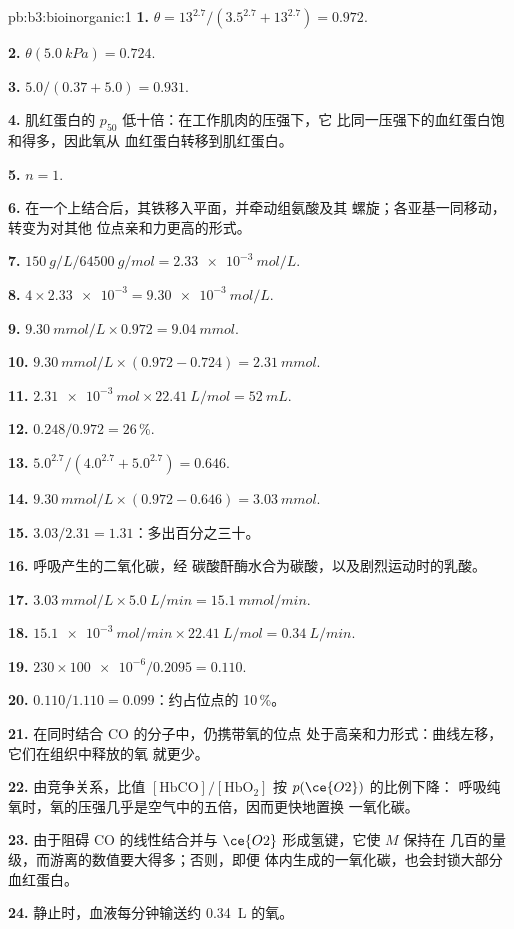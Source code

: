 \begin{solution}{pb:b3:bioinorganic:1}
\textbf{1.} $\theta = 13^{2.7}/(3.5^{2.7} + 13^{2.7}) = 0.972$.

\textbf{2.} $\theta(\qty{5.0}{kPa}) = 0.724$.

\textbf{3.} $5.0/(0.37 + 5.0) = 0.931$.

\textbf{4.} 肌红蛋白的 $p_{50}$ 低十倍：在工作肌肉的压强下，它
比同一压强下的血红蛋白饱和得多，因此氧从
血红蛋白转移到肌红蛋白。

\textbf{5.} $n = 1$.

\textbf{6.} 在一个上结合后，其铁移入平面，并牵动组氨酸及其
螺旋；各亚基一同移动，转变为对其他
位点亲和力更高的形式。

\textbf{7.} $\qty{150}{g/L}/\qty{64500}{g/mol} = \qty{2.33e-3}{mol/L}$.

\textbf{8.} $4 \times \num{2.33e-3} = \qty{9.30e-3}{mol/L}$.

\textbf{9.} $\qty{9.30}{mmol/L} \times 0.972 = \qty{9.04}{mmol}$.

\textbf{10.} $\qty{9.30}{mmol/L} \times (0.972 - 0.724) = \qty{2.31}{mmol}$.

\textbf{11.} $\qty{2.31e-3}{mol} \times \qty{22.41}{L/mol} = \qty{52}{mL}$.

\textbf{12.} $0.248/0.972 = 26$\,\%.

\textbf{13.} $5.0^{2.7}/(4.0^{2.7} + 5.0^{2.7}) = 0.646$.

\textbf{14.} $\qty{9.30}{mmol/L} \times (0.972 - 0.646) = \qty{3.03}{mmol}$.

\textbf{15.} $3.03/2.31 = 1.31$：多出百分之三十。

\textbf{16.} 呼吸产生的二氧化碳，经
碳酸酐酶水合为碳酸，以及剧烈运动时的乳酸。

\textbf{17.} $\qty{3.03}{mmol/L} \times \qty{5.0}{L/min} = \qty{15.1}{mmol/min}$.

\textbf{18.} $\qty{15.1e-3}{mol/min} \times \qty{22.41}{L/mol} = \qty{0.34}{L/min}$.

\textbf{19.} $230 \times \num{100e-6}/0.2095 = 0.110$.

\textbf{20.} $0.110/1.110 = 0.099$：约占位点的 10\,\%。

\textbf{21.} 在同时结合 CO 的分子中，仍携带氧的位点
处于高亲和力形式：曲线左移，它们在组织中释放的氧
就更少。

\textbf{22.} 由竞争关系，比值 $[\mathrm{HbCO}]/[\mathrm{HbO_2}]$ 按 $p(\ce{O2})$ 的比例下降：
呼吸纯氧时，氧的压强几乎是空气中的五倍，因而更快地置换
一氧化碳。

\textbf{23.} 由于阻碍 CO 的线性结合并与 $\ce{O2}$ 形成氢键，它使 $M$ 保持在
几百的量级，而游离的数值要大得多；否则，即便
体内生成的一氧化碳，也会封锁大部分血红蛋白。

\textbf{24.} 静止时，血液每分钟输送约 \qty{0.34}{L} 的氧。
\end{solution}
